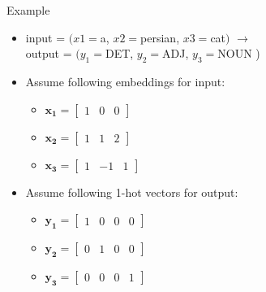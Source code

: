 \begin{frame}{Example}
\begin{itemize}
    \item input = $\big( x1=$a, $x2=$persian, $x3=$cat$ \big) $ $\longrightarrow$ \\ output = $ \big( y_1=$DET, $y_2=$ADJ, $y_3=$NOUN \big) 
    \item Assume following embeddings for input:
        \begin{itemize}
            \item $\bm{x_1} = \begin{bmatrix} 1 & 0 & 0 \end{bmatrix}$
            \item $\bm{x_2} = \begin{bmatrix} 1 & 1 & 2 \end{bmatrix}$
            \item $\bm{x_3} = \begin{bmatrix}  1 & -1 & 1 \end{bmatrix}$
        \end{itemize}
    \item Assume following 1-hot vectors for output:
    \begin{itemize}
        \item $\bm{y_1} = \begin{bmatrix} 1 & 0 & 0 & 0\end{bmatrix}$
        \item $\bm{y_2} = \begin{bmatrix} 0 & 1 & 0 & 0\end{bmatrix}$
        \item $\bm{y_3} = \begin{bmatrix} 0 & 0 & 0 & 1\end{bmatrix}$
    \end{itemize}
\end{itemize}
\end{frame}

